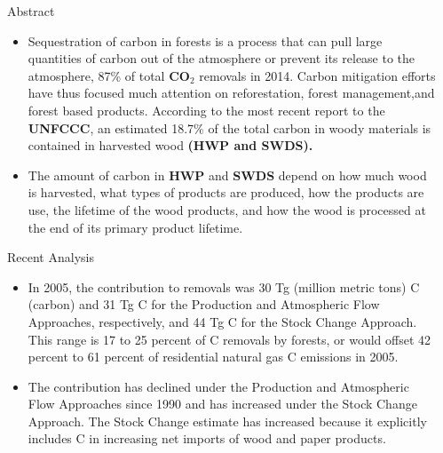 \documentclass[final]{beamer}\usepackage[]{graphicx}\usepackage[]{color}
\newlength{\sepwid}
\newlength{\onecolwid}
\begin{document}
\begin{frame}[t]
\begin{columns}[t]
\begin{column}{\sepwid}\end{column} %

\begin{column}{\onecolwid} %


\begin{alertblock}{Abstract}
\begin{itemize}

\item Sequestration of carbon in forests is a process that can pull large quantities of carbon out of the atmosphere or prevent its release to the atmosphere, 87\% of total \textbf{CO$_{2}$} removals in 2014. Carbon mitigation efforts have thus focused much attention on reforestation, forest management,and forest based products. According to the most recent report to the \textbf{UNFCCC}, an estimated 18.7\% of the total carbon in woody materials is contained in harvested wood \textbf{(HWP and SWDS).}  


\item The amount of carbon in \textbf{HWP} and \textbf{SWDS} depend on how much wood is harvested, what types of products are produced, how the products are use, the lifetime of the wood products, and how the wood is processed at the end of its primary product lifetime.

\end{itemize}
\end{alertblock}

\begin{block}{Recent Analysis}
\begin{itemize}
\item In 2005, the contribution to removals was 30 Tg (million metric tons) C (carbon) and 31 Tg C for the Production and Atmospheric Flow Approaches, respectively, and 44 Tg C for the Stock Change Approach. This range is 17 to 25 percent of C removals by forests, or would offset 42 percent to 61 percent of residential natural gas C emissions in 2005. 
\vspace{1ex}
\item The contribution has declined under the Production and Atmospheric Flow Approaches since 1990 and has increased under the Stock Change Approach. The Stock Change estimate has increased because it explicitly includes C in increasing net imports of wood and paper products. 
\vspace{1ex}
\end{itemize}
\vspace{0ex}
\vfill


\end{block}
\end{column}
\end{columns}
\end{frame}
\end{document}
